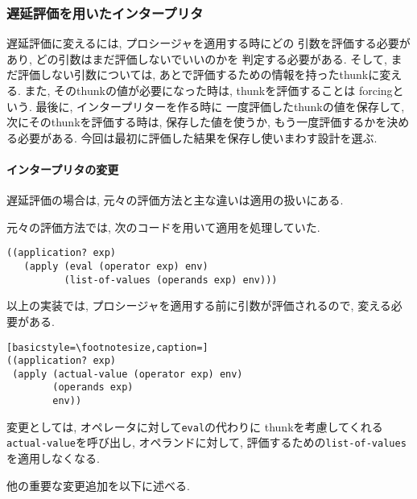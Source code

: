 \subsubsection{遅延評価を用いたインタープリタ}
遅延評価に変えるには, プロシージャを適用する時にどの
引数を評価する必要があり, どの引数はまだ評価しないでいいのかを
判定する必要がある. そして, まだ評価しない引数については,
あとで評価するための情報を持ったthunkに変える. また,
そのthunkの値が必要になった時は, thunkを評価することは
forcingという. 最後に, インタープリターを作る時に
一度評価したthunkの値を保存して, 次にそのthunkを評価する時は,
保存した値を使うか, もう一度評価するかを決める必要がある.
今回は最初に評価した結果を保存し使いまわす設計を選ぶ.

\paragraph{インタープリタの変更}
遅延評価の場合は, 元々の評価方法と主な違いは適用の扱いにある.

元々の評価方法では, 次のコードを用いて適用を処理していた.

\begin{lstlisting}[basicstyle=\footnotesize]
((application? exp)
   (apply (eval (operator exp) env)
          (list-of-values (operands exp) env)))
\end{lstlisting}

以上の実装では, プロシージャを適用する前に引数が評価されるので,
変える必要がある.

\begin{lstlisting}[basicstyle=\footnotesize,caption=]
((application? exp)
 (apply (actual-value (operator exp) env)
        (operands exp)
        env))
\end{lstlisting}
変更としては, オペレータに対して\lstinline{eval}の代わりに
thunkを考慮してくれる\lstinline{actual-value}を呼び出し,
オペランドに対して, 評価するための\lstinline{list-of-values}を適用しなくなる.

他の重要な変更追加を以下に述べる.

